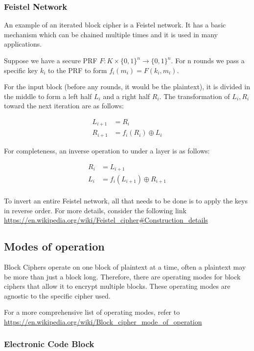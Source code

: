 \documentclass{article}
\begin{document}
\begin{multicols}{2}
\subsubsection{Feistel Network}

An example of an iterated block cipher is a Feistel network. It has a basic mechanism which can be chained multiple times and it is used in many applications.

Suppose we have a secure PRF $F: K \times \{0,1\}^n \rightarrow \{0,1\}^n$. For n rounds we pass a specific key $k_i$ to the PRF to form $f_i(m_i) = F(k_i, m_i)$. 

For the input block (before any rounds, it would be the plaintext), it is divided in the middle to form a left half $L_i$ and a right half $R_i$. The transformation of $L_i, R_i$ toward the next iteration are as follows:

\[
\begin{split}
    L_{i+1} &= R_i\\
    R_{i+1} &= f_i(R_i) \oplus L_i
\end{split}
\]

For completeness, an inverse operation to under a layer is as follows:

\[
\begin{split}
    R_i &= L_{i+1}\\
    L_i &= f_i(L_{i+1}) \oplus R_{i+1}\\
\end{split}
\]

To invert an entire Feistel network, all that needs to be done is to apply the keys in reverse order. For more details, consider the following link \url{https://en.wikipedia.org/wiki/Feistel_cipher#Construction_details}

\subsection{Modes of operation}

Block Ciphers operate on one block of plaintext at a time, often a plaintext may be more than just a block long. Therefore, there are operating modes for block ciphers that allow it to encrypt multiple blocks. These operating modes are agnostic to the specific cipher used. 

For a more comprehensive list of operating modes, refer to \url{https://en.wikipedia.org/wiki/Block_cipher_mode_of_operation}

\subsubsection{Electronic Code Block}


\end{multicols}
\end{document}
